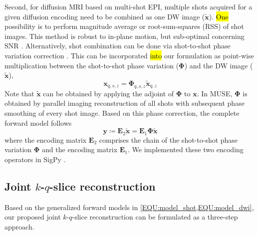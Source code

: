 \documentclass[preprint,12pt,authoryear,review]{elsarticle}
\begin{document}

    Second, for diffusion MRI based on multi-shot EPI,
    multiple shots acquired for a given diffusion encoding
    need to be combined as one DW image ($\mathbf{\tilde{x}}$).
    \hl{One} possibility is to perform magnitude average
    \citep{chen_2013_muse}
    or root-sum-squares (RSS) \citep{mani_2017_mussels}
    of shot images.
    This method is robust to in-plane motion,
    but sub-optimal concerning SNR
    \citep{guhaniyogi_2016_amuse}.
    Alternatively, shot combination can be done
    via shot-to-shot phase variation correction
    \citep{liu_2005_moco_diff,chen_2013_muse}.
    This can be incorporated \hl{into} our formulation
    as point-wise multiplication
    between the shot-to-shot phase variation ($\mathbf{\Phi}$) and
    the DW image ($\mathbf{\tilde{x}}$),
    \begin{equation}
         \mathbf{x}_{q,s,z} = \mathbf{\Phi}_{q,s,z} \mathbf{\tilde{x}}_{q,z}
    \end{equation}
    Note that $\mathbf{\tilde{x}}$ can be obtained
    by applying the adjoint of $\mathbf{\Phi}$ to $\mathbf{x}$.
    In MUSE, $\mathbf{\Phi}$ is obtained by parallel imaging reconstruction of all shots
    with subsequent phase smoothing of every shot image.
    Based on this phase correction, the complete forward model follows
    \begin{equation}
        \mathbf{y} \coloneqq \mathbf{E}_2 \mathbf{\tilde{x}} = \mathbf{E}_1 \mathbf{\Phi} \mathbf{\tilde{x}}
        \label{EQU:model_dwi}
    \end{equation}
    where the encoding matrix $\mathbf{E}_2$ comprises the chain of
    the shot-to-shot phase variation $\mathbf{\Phi}$ and
    the encoding matrix $\mathbf{E}_1$.
    We implemented these two encoding operators
    in SigPy \citep{ong_2019_sigpy}.


    \subsection{Joint $k$-$q$-slice reconstruction}
    \label{SUBSEC:JETS}

    Based on the generalized forward models in \cref{EQU:model_shot,EQU:model_dwi},
    our proposed joint $k$-$q$-slice reconstruction can be formulated as a three-step approach.
\end{document}
